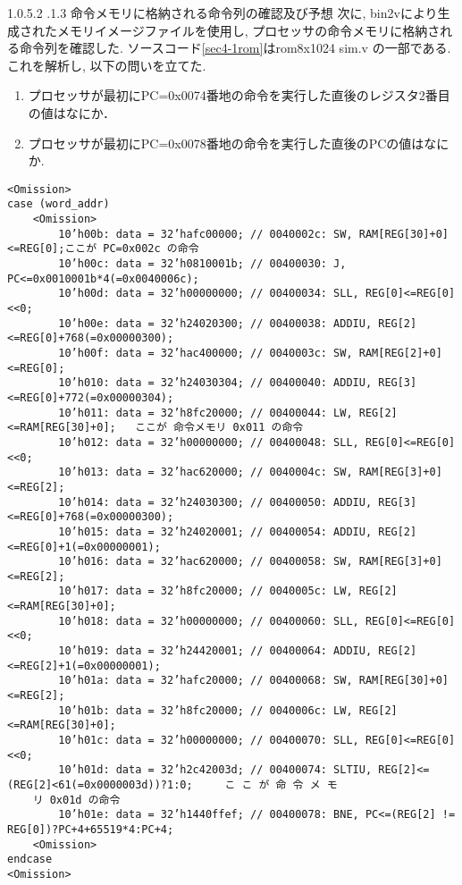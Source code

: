 \documentclass[epsf,a4paper,dvipdfmx,autodetect-engine,titlepage]{jsarticle}
\makeatletter
\newcommand{\subsubsubsection}
{\@startsection{paragraph}{4}{\z@}%
{1.0\Cvs \@plus.5\Cdp \@minus.2\Cdp}%
{.1\Cvs \@plus.3\Cdp}%
{\reset@font\sffamily\normalsize}}
\makeatother
\begin{document}
\subsubsubsection{命令メモリに格納される命令列の確認及び予想}
次に, bin2vにより生成されたメモリイメージファイルを使用し, プロセッサの命令メモリに格納される命令列を確認した. ソースコード\ref{sec4-1rom}はrom8x1024 sim.v の一部である. これを解析し, 以下の問いを立てた. 
\begin{enumerate}
    \item プロセッサが最初にPC=0x0074番地の命令を実行した直後のレジスタ2番目の値はなにか．
    
    \item プロセッサが最初にPC=0x0078番地の命令を実行した直後のPCの値はなにか.
\end{enumerate}
\begin{lstlisting}[caption=実験4-1で生成されたrom8x1024\_sim.v,label=sec4-1rom]
<Omission>
case (word_addr)
    <Omission>
        10’h00b: data = 32’hafc00000; // 0040002c: SW, RAM[REG[30]+0]<=REG[0];ここが PC=0x002c の命令
        10’h00c: data = 32’h0810001b; // 00400030: J, PC<=0x0010001b*4(=0x0040006c);
        10’h00d: data = 32’h00000000; // 00400034: SLL, REG[0]<=REG[0]<<0;
        10’h00e: data = 32’h24020300; // 00400038: ADDIU, REG[2]<=REG[0]+768(=0x00000300);
        10’h00f: data = 32’hac400000; // 0040003c: SW, RAM[REG[2]+0]<=REG[0];
        10’h010: data = 32’h24030304; // 00400040: ADDIU, REG[3]<=REG[0]+772(=0x00000304);
        10’h011: data = 32’h8fc20000; // 00400044: LW, REG[2]<=RAM[REG[30]+0];   ここが 命令メモリ 0x011 の命令
        10’h012: data = 32’h00000000; // 00400048: SLL, REG[0]<=REG[0]<<0;
        10’h013: data = 32’hac620000; // 0040004c: SW, RAM[REG[3]+0]<=REG[2];
        10’h014: data = 32’h24030300; // 00400050: ADDIU, REG[3]<=REG[0]+768(=0x00000300);
        10’h015: data = 32’h24020001; // 00400054: ADDIU, REG[2]<=REG[0]+1(=0x00000001);
        10’h016: data = 32’hac620000; // 00400058: SW, RAM[REG[3]+0]<=REG[2];
        10’h017: data = 32’h8fc20000; // 0040005c: LW, REG[2]<=RAM[REG[30]+0];
        10’h018: data = 32’h00000000; // 00400060: SLL, REG[0]<=REG[0]<<0;
        10’h019: data = 32’h24420001; // 00400064: ADDIU, REG[2]<=REG[2]+1(=0x00000001);
        10’h01a: data = 32’hafc20000; // 00400068: SW, RAM[REG[30]+0]<=REG[2];
        10’h01b: data = 32’h8fc20000; // 0040006c: LW, REG[2]<=RAM[REG[30]+0];
        10’h01c: data = 32’h00000000; // 00400070: SLL, REG[0]<=REG[0]<<0;
        10’h01d: data = 32’h2c42003d; // 00400074: SLTIU, REG[2]<=(REG[2]<61(=0x0000003d))?1:0;     こ こ が 命 令 メ モ
    リ 0x01d の命令
        10’h01e: data = 32’h1440ffef; // 00400078: BNE, PC<=(REG[2] != REG[0])?PC+4+65519*4:PC+4;
    <Omission>
endcase
<Omission>
\end{lstlisting}
\end{document}
